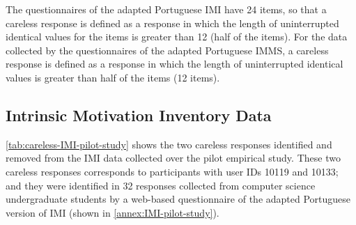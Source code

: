 The questionnaires of the adapted Portuguese IMI have 24 items, so that a careless response is defined as a response in which the length of uninterrupted identical values for the items is greater than 12 (half of the items). For the data collected by the questionnaires of the adapted Portuguese IMMS, a careless response is defined as a response in which the length of uninterrupted identical values is greater than half of the items (12 items).

\subsection{Intrinsic Motivation Inventory Data}

\autoref{tab:careless-IMI-pilot-study} shows the two careless responses identified and removed from the IMI data collected over the pilot empirical study. These two careless responses corresponds to participants with user IDs 10119 and 10133; and they were identified in 32 responses collected from computer science undergraduate students by a web-based questionnaire of the adapted Portuguese version of IMI (shown in \autoref{annex:IMI-pilot-study}).


